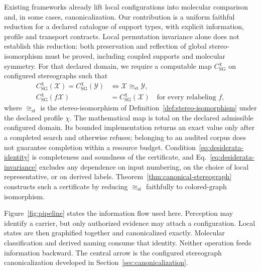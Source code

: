 \documentclass[pdflatex,sn-mathphys-num,referee,lineno]{sn-jnl}
\theoremstyle{plain}
\theoremstyle{remark}
\theoremstyle{definition}
\begin{document}
Existing frameworks already lift local configurations into molecular comparison
and, in some cases, canonicalization.  Our contribution is a uniform faithful
reduction for a declared catalogue of support types, with explicit information,
profile and transport contracts.  Local permutation invariance alone does not
establish this reduction: both preservation and reflection of global
stereo-isomorphism must be proved, including coupled supports and molecular
symmetry.  For that declared domain, we require a
computable map \(C^\chi_{\mathrm{SG}}\) on configured stereographs such that
\begin{align}
  C^\chi_{\mathrm{SG}}(\mathcal X)=C^\chi_{\mathrm{SG}}(\mathcal Y)
  &\iff \mathcal X\cong_{\mathrm{st}}\mathcal Y,
  \label{eq:desiderata-identity}\\
  C^\chi_{\mathrm{SG}}(f\mathcal X)&=C^\chi_{\mathrm{SG}}(\mathcal X)
  \quad\text{for every relabeling }f,
  \label{eq:desiderata-invariance}
\end{align}
where \(\cong_{\mathrm{st}}\) is the stereo-isomorphism of
Definition~\ref{def:stereo-isomorphism} under the declared profile \(\chi\).
The mathematical map is total on the declared admissible configured domain.
Its bounded implementation returns an exact value only after a completed
search and otherwise refuses; belonging to an audited corpus does not guarantee
completion within a resource budget.
Condition~\eqref{eq:desiderata-identity} is completeness and soundness of the
certificate, and Eq.~\eqref{eq:desiderata-invariance} excludes any dependence on
input numbering, on the choice of local representative, or on derived labels.
Theorem~\ref{thm:canonical-stereograph} constructs such a certificate by
reducing \(\cong_{\mathrm{st}}\) faithfully to colored-graph isomorphism.

Figure~\ref{fig:pipeline} states the information flow used here.  Perception
may identify a carrier, but only authorized evidence may attach a
configuration.  Local states are then graphified together and canonicalized
exactly.  Molecular classification and derived naming consume that identity.
Neither operation feeds information backward.  The central arrow is the configured
stereograph canonicalization developed in Section~\ref{sec:canonicalization}.
\end{document}

